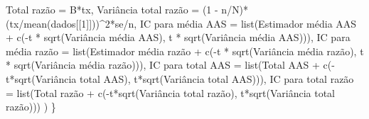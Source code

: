\documentclass[
  letterpaper,
  DIV=11,
  numbers=noendperiod]{scrartcl}
\newenvironment{Shaded}{\begin{snugshade}}{\end{snugshade}}
\newcommand{\AttributeTok}[1]{\textcolor[rgb]{0.40,0.45,0.13}{#1}}
\newcommand{\DecValTok}[1]{\textcolor[rgb]{0.68,0.00,0.00}{#1}}
\newcommand{\FunctionTok}[1]{\textcolor[rgb]{0.28,0.35,0.67}{#1}}
\newcommand{\NormalTok}[1]{\textcolor[rgb]{0.00,0.23,0.31}{#1}}
\newcommand{\OtherTok}[1]{\textcolor[rgb]{0.00,0.23,0.31}{#1}}
\newcommand{\SpecialCharTok}[1]{\textcolor[rgb]{0.37,0.37,0.37}{#1}}
\newcommand{\StringTok}[1]{\textcolor[rgb]{0.13,0.47,0.30}{#1}}
\begin{document}
\begin{Shaded}
\begin{Highlighting}[]
    \StringTok{\textasciigrave{}}\AttributeTok{Total razão}\StringTok{\textasciigrave{}} \OtherTok{=}\NormalTok{ B}\SpecialCharTok{*}\NormalTok{tx,}
    \StringTok{\textasciigrave{}}\AttributeTok{Variância total razão}\StringTok{\textasciigrave{}} \OtherTok{=}\NormalTok{ (}\DecValTok{1} \SpecialCharTok{{-}}\NormalTok{ n}\SpecialCharTok{/}\NormalTok{N)}\SpecialCharTok{*}\NormalTok{(tx}\SpecialCharTok{/}\FunctionTok{mean}\NormalTok{(dados[[}\DecValTok{1}\NormalTok{]]))}\SpecialCharTok{\^{}}\DecValTok{2}\SpecialCharTok{*}\NormalTok{se}\SpecialCharTok{/}\NormalTok{n,}
    \StringTok{\textasciigrave{}}\AttributeTok{IC para média AAS}\StringTok{\textasciigrave{}} \OtherTok{=} \FunctionTok{list}\NormalTok{(}\StringTok{\textasciigrave{}}\AttributeTok{Estimador média AAS}\StringTok{\textasciigrave{}} \SpecialCharTok{+} \FunctionTok{c}\NormalTok{(}\SpecialCharTok{{-}}\NormalTok{t }\SpecialCharTok{*} \FunctionTok{sqrt}\NormalTok{(}\StringTok{\textasciigrave{}}\AttributeTok{Variância média AAS}\StringTok{\textasciigrave{}}\NormalTok{), t }\SpecialCharTok{*} \FunctionTok{sqrt}\NormalTok{(}\StringTok{\textasciigrave{}}\AttributeTok{Variância média AAS}\StringTok{\textasciigrave{}}\NormalTok{))),}
    \StringTok{\textasciigrave{}}\AttributeTok{IC para média razão}\StringTok{\textasciigrave{}} \OtherTok{=} \FunctionTok{list}\NormalTok{(}\StringTok{\textasciigrave{}}\AttributeTok{Estimador média razão}\StringTok{\textasciigrave{}} \SpecialCharTok{+} \FunctionTok{c}\NormalTok{(}\SpecialCharTok{{-}}\NormalTok{t }\SpecialCharTok{*} \FunctionTok{sqrt}\NormalTok{(}\StringTok{\textasciigrave{}}\AttributeTok{Variância média razão}\StringTok{\textasciigrave{}}\NormalTok{), t }\SpecialCharTok{*} \FunctionTok{sqrt}\NormalTok{(}\StringTok{\textasciigrave{}}\AttributeTok{Variância média razão}\StringTok{\textasciigrave{}}\NormalTok{))),}
    \StringTok{\textasciigrave{}}\AttributeTok{IC para total AAS}\StringTok{\textasciigrave{}} \OtherTok{=} \FunctionTok{list}\NormalTok{(}\StringTok{\textasciigrave{}}\AttributeTok{Total AAS}\StringTok{\textasciigrave{}} \SpecialCharTok{+} \FunctionTok{c}\NormalTok{(}\SpecialCharTok{{-}}\NormalTok{t}\SpecialCharTok{*}\FunctionTok{sqrt}\NormalTok{(}\StringTok{\textasciigrave{}}\AttributeTok{Variância total AAS}\StringTok{\textasciigrave{}}\NormalTok{), t}\SpecialCharTok{*}\FunctionTok{sqrt}\NormalTok{(}\StringTok{\textasciigrave{}}\AttributeTok{Variância total AAS}\StringTok{\textasciigrave{}}\NormalTok{))),}
    \StringTok{\textasciigrave{}}\AttributeTok{IC para total razão}\StringTok{\textasciigrave{}} \OtherTok{=} \FunctionTok{list}\NormalTok{(}\StringTok{\textasciigrave{}}\AttributeTok{Total razão}\StringTok{\textasciigrave{}} \SpecialCharTok{+} \FunctionTok{c}\NormalTok{(}\SpecialCharTok{{-}}\NormalTok{t}\SpecialCharTok{*}\FunctionTok{sqrt}\NormalTok{(}\StringTok{\textasciigrave{}}\AttributeTok{Variância total razão}\StringTok{\textasciigrave{}}\NormalTok{), t}\SpecialCharTok{*}\FunctionTok{sqrt}\NormalTok{(}\StringTok{\textasciigrave{}}\AttributeTok{Variância total razão}\StringTok{\textasciigrave{}}\NormalTok{)))}
\NormalTok{  ) }
\NormalTok{\}}
\end{Highlighting}
\end{Shaded}
\end{document}
